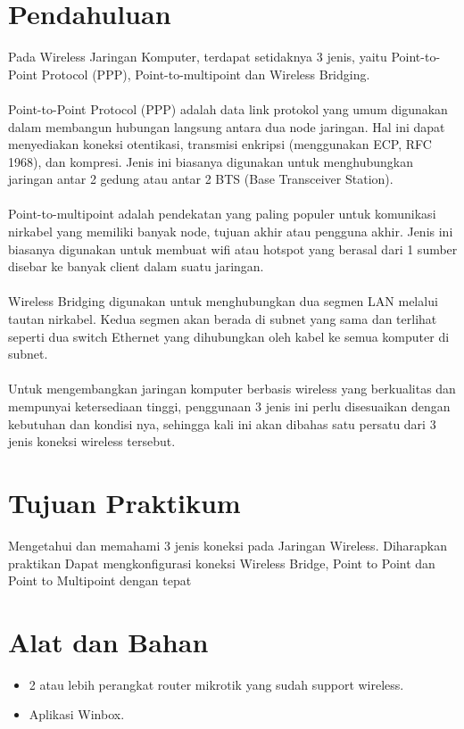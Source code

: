 \section{Pendahuluan}
Pada Wireless Jaringan Komputer, terdapat setidaknya 3 jenis, yaitu Point-to-Point Protocol (PPP),
Point-to-multipoint dan Wireless Bridging. 
\\ \\ \indent Point-to-Point Protocol (PPP) adalah data link protokol yang umum digunakan dalam membangun 
hubungan langsung antara dua node jaringan. Hal ini dapat menyediakan koneksi otentikasi, transmisi enkripsi (menggunakan ECP, RFC 1968), dan kompresi. 
Jenis ini biasanya digunakan untuk menghubungkan jaringan antar 2 gedung atau antar 2 BTS (Base Transceiver Station).
\\ \\ \indent Point-to-multipoint adalah pendekatan yang paling populer untuk komunikasi nirkabel yang memiliki banyak node, tujuan akhir atau pengguna akhir. 
Jenis ini biasanya digunakan untuk membuat wifi atau hotspot yang berasal dari 1 sumber disebar ke banyak client dalam suatu jaringan.
\\ \\ \indent Wireless Bridging digunakan untuk menghubungkan dua segmen LAN melalui tautan nirkabel. Kedua
segmen akan berada di subnet yang sama dan terlihat seperti dua switch Ethernet yang dihubungkan
oleh kabel ke semua komputer di subnet.
\\ \\ \indent Untuk mengembangkan jaringan komputer berbasis wireless yang berkualitas dan mempunyai ketersediaan tinggi, penggunaan 3 jenis ini perlu disesuaikan dengan kebutuhan dan kondisi nya, sehingga
kali ini akan dibahas satu persatu dari 3 jenis koneksi wireless tersebut.

\section{Tujuan Praktikum}
Mengetahui dan memahami 3 jenis koneksi pada Jaringan Wireless.
Diharapkan praktikan Dapat mengkonfigurasi koneksi Wireless Bridge, Point to Point dan Point to Multipoint dengan tepat

\section{Alat dan Bahan}
\begin{itemize}[label=$\bullet$, itemsep=-1pt, leftmargin=*]
	\item 2 atau lebih perangkat router mikrotik yang sudah support wireless.
	\item Aplikasi Winbox.
\end{itemize}

